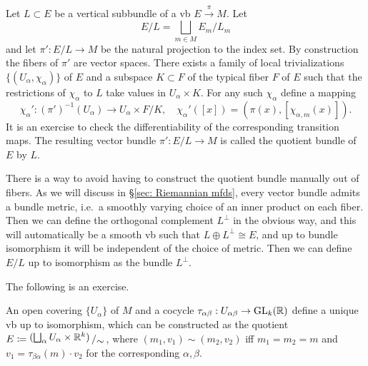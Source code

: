 \begin{defn}
    Let $L\subset E$ be a vertical subbundle of a \gls{vb} $E\overset{\pi}{\to}M$. Let
    \[E\slash L=\bigsqcup_{m\in M}E_m\slash L_m\]
    and let $\pi':E\slash L\to M$ be the natural projection to the index set. By construction the fibers of $\pi'$ are vector spaces. There exists a family of local trivializations $\{(U_\alpha,\chi_\alpha)\}$ of $E$ and a subspace $K\subset F$ of the typical fiber $F$ of $E$ such that the restrictions of $\chi_\alpha$ to $L$ take values in $U_\alpha\times K$. For any such $\chi_\alpha$ define a mapping
    \[\chi_\alpha':(\pi')^{-1}(U_\alpha)\to U_\alpha\times F\slash K,\quad \chi_\alpha'([x])=(\pi(x),[\chi_{\alpha,m}(x)]).\]
    It is an exercise to check the differentiability of the corresponding transition maps. The resulting vector bundle $\pi':E\slash L\to M$ is called the quotient bundle of $E$ by $L$.
\end{defn}
\begin{rem}
    There is a way to avoid having to construct the quotient bundle manually out of fibers. As we will discuss in \S\ref{sec: Riemannian mfds}, every vector bundle admits a bundle metric, i.e.~a smoothly varying choice of an inner product on each fiber. Then we can define the orthogonal complement $L^\perp$ in the obvious way, and this will automatically be a smooth \gls{vb} such that $L\oplus L^\perp\cong E$, and up to bundle isomorphism it will be independent of the choice of metric. Then we can define $E\slash L$ up to isomorphism as the bundle $L^\perp$.
\end{rem}


The following is an exercise.
\begin{prop}
    An open covering $\{U_\alpha\}$ of $M$ and a cocycle $\tau_{\alpha\beta}:U_{\alpha\beta}\to\operatorname{GL}_k (\mathbb{R} )$ define a unique \gls{vb} up to isomorphism, which can be constructed as the quotient $E\coloneqq \bigslant{(\bigsqcup_\alpha U_\alpha \times \bbR^k)}{\sim}$, where $(m_1,v_1)\sim(m_2,v_2)$ iff $m_1=m_2=m$ and $v_1=\tau_{\beta\alpha}(m)\cdot v_2$ for the corresponding $\alpha,\beta$.
\end{prop}




